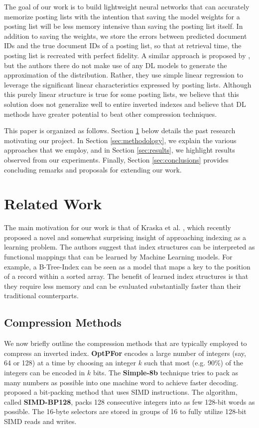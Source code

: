 \documentclass{article}
\begin{document}
The goal of our work is to build lightweight neural networks that can accurately memorize posting lists with the intention that saving the model weights for a posting list will be less memory intensive than saving the posting list itself.
In addition to saving the weights, we store the errors between predicted document IDs and the true document IDs of a posting list, so that at retrieval time, the posting list is recreated with perfect fidelity.
A similar approach is proposed by \citet{GPU}, but the authors there do not make use of any DL models to generate the approximation of the distribution.
Rather, they use simple linear regression to leverage the significant linear characteristics expressed by posting lists.
Although this purely linear structure is true for some posting lists, we believe that this solution does not generalize well to entire inverted indexes and believe that DL methods have greater potential to beat other compression techniques.

This paper is organized as follows.
Section \ref{sec:related_work} below details the past research motivating our project.
In Section \ref{sec:methodology}, we explain the various approaches that we employ, and in Section \ref{sec:results}, we highlight results observed from our experiments.
Finally, Section \ref{sec:conclusions} provides concluding remarks and proposals for extending our work.

\section{Related Work}\label{sec:related_work}
The main motivation for our work is that of Kraska et al. \cite{Kraska2018}, which recently proposed a novel and somewhat surprising insight of approaching indexing as a learning problem.
The authors suggest that index structures can be interpreted as functional mappings that can be learned by Machine Learning models. 
For example, a B-Tree-Index can be seen as a model that maps a key to the position of a record within a sorted array.
The benefit of learned index structures is that they require less memory and can be evaluated substantially faster than their traditional counterparts.

\subsection{Compression Methods}
We now briefly outline the compression methods that are typically employed to compress an inverted index.
\textbf{OptPFor} \cite{OptPForDelta} encodes a large number of integers (say, 64 or 128) at a time by choosing an integer $k$ such that most (e.g. 90\%) of the integers can be encoded in $k$ bits.
The \textbf{Simple-8b} \cite{simple8b} technique tries to pack as many numbers as possible into one machine word to achieve faster decoding.
\citet{SIMD-BP128} proposed a bit-packing method that uses SIMD instructions.
The algorithm, called \textbf{SIMD-BP128}, packs 128 consecutive integers into as few 128-bit words as possible.
The 16-byte selectors are stored in groups of 16 to fully utilize 128-bit SIMD reads and writes.
\end{document}
